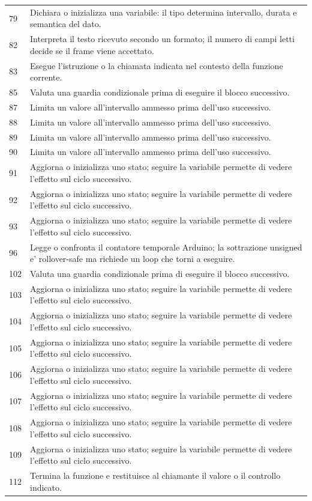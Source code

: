 \documentclass[11pt,a4paper]{article}
\begin{document}
\begin{longtable}{p{}p{}}
79 & Dichiara o inizializza una variabile: il tipo determina intervallo, durata e semantica del dato. \\
82 & Interpreta il testo ricevuto secondo un formato; il numero di campi letti decide se il frame viene accettato. \\
83 & Esegue l'istruzione o la chiamata indicata nel contesto della funzione corrente. \\
85 & Valuta una guardia condizionale prima di eseguire il blocco successivo. \\
87 & Limita un valore all'intervallo ammesso prima dell'uso successivo. \\
88 & Limita un valore all'intervallo ammesso prima dell'uso successivo. \\
89 & Limita un valore all'intervallo ammesso prima dell'uso successivo. \\
90 & Limita un valore all'intervallo ammesso prima dell'uso successivo. \\
91 & Aggiorna o inizializza uno stato; seguire la variabile permette di vedere l'effetto sul ciclo successivo. \\
92 & Aggiorna o inizializza uno stato; seguire la variabile permette di vedere l'effetto sul ciclo successivo. \\
93 & Aggiorna o inizializza uno stato; seguire la variabile permette di vedere l'effetto sul ciclo successivo. \\
96 & Legge o confronta il contatore temporale Arduino; la sottrazione unsigned e' rollover-safe ma richiede un loop che torni a eseguire. \\
102 & Valuta una guardia condizionale prima di eseguire il blocco successivo. \\
103 & Aggiorna o inizializza uno stato; seguire la variabile permette di vedere l'effetto sul ciclo successivo. \\
104 & Aggiorna o inizializza uno stato; seguire la variabile permette di vedere l'effetto sul ciclo successivo. \\
105 & Aggiorna o inizializza uno stato; seguire la variabile permette di vedere l'effetto sul ciclo successivo. \\
106 & Aggiorna o inizializza uno stato; seguire la variabile permette di vedere l'effetto sul ciclo successivo. \\
107 & Aggiorna o inizializza uno stato; seguire la variabile permette di vedere l'effetto sul ciclo successivo. \\
108 & Aggiorna o inizializza uno stato; seguire la variabile permette di vedere l'effetto sul ciclo successivo. \\
109 & Aggiorna o inizializza uno stato; seguire la variabile permette di vedere l'effetto sul ciclo successivo. \\
112 & Termina la funzione e restituisce al chiamante il valore o il controllo indicato. \\
\bottomrule
\end{longtable}
\end{document}
